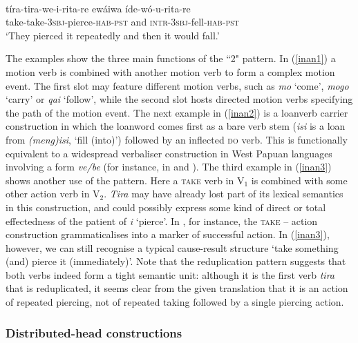 \ea \label{inan3}
\\
\gll tíra-tira-we-i-rita-re ewáiwa íde-wó-u-rita-re \\
take-take-3\textsc{sbj}-pierce-\textsc{hab}-\textsc{pst} and \textsc{intr}-3\textsc{sbj}-fell-\textsc{hab}-\textsc{pst} \\
\glft `They pierced it repeatedly and then it would fall.'\\ 
\z

The examples show the three main functions of the  ``2" pattern. In (\ref{inan1}) a motion verb is combined with another motion verb to form a complex motion event. The first slot may feature different motion verbs, such as \textit{mo} `come', \textit{mogo} `carry' or \textit{qai} `follow', while the second slot hosts directed motion verbs specifying the path of the motion event. The next example in (\ref{inan2}) is a loanverb carrier construction in which the loanword comes first as a bare verb stem (\textit{isi} is a loan from  \textit{(meng)isi}, `fill (into)') followed by an inflected \textsc{do} verb. This is functionally equivalent to a widespread verbaliser construction in West Papuan languages involving a form \textit{ve/be} (for instance, in  and ). The third example in (\ref{inan3}) shows another use of the pattern. Here a \textsc{take} verb in V$_1$ is combined with some other action verb in V$_2$. \textit{Tira} may have already lost part of its lexical semantics in this construction, and could possibly express some kind of direct or total effectedness of the patient of \textit{i} `pierce'. In , for instance, the \textsc{take} -- action construction grammaticalises into a marker of successful action. In (\ref{inan3}), however, we can still recognise a typical cause-result structure `take something (and) pierce it (immediately)'. Note that the reduplication pattern suggests that both verbs indeed form a tight semantic unit: although it is the first verb \textit{tira} that is reduplicated, it seems clear from the given translation that it is an action of repeated piercing, not of repeated taking followed by a single piercing action.

\subsubsection{Distributed-head constructions}


